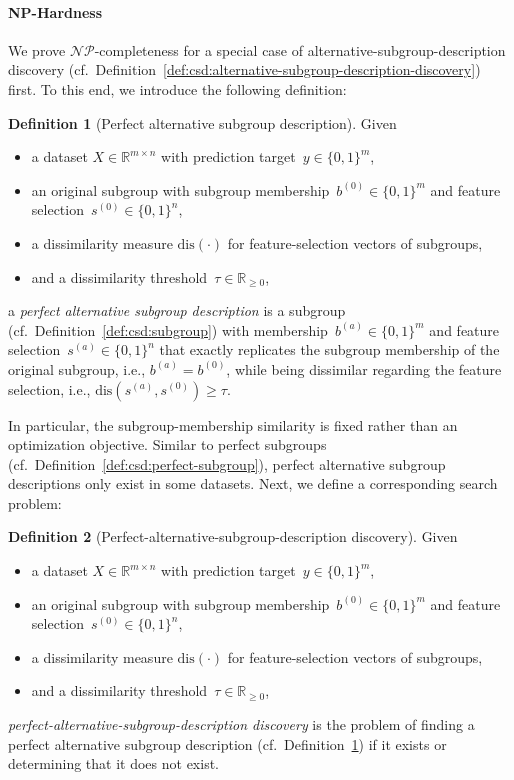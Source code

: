 \documentclass{article}
\theoremstyle{definition}
\newtheorem{definition}{Definition}
\begin{document}
\paragraph{NP-Hardness}

We prove $\mathcal{NP}$-completeness for a special case of alternative-subgroup-description discovery (cf.~Definition~\ref{def:csd:alternative-subgroup-description-discovery}) first.
To this end, we introduce the following definition:
%
\begin{definition}[Perfect alternative subgroup description]
	Given
	\begin{itemize}[noitemsep]
		\item a dataset $X \in \mathbb{R}^{m \times n}$ with prediction target~$y \in \{0, 1\}^m$,
		\item an original subgroup with subgroup membership~$b^{(0)} \in \{0, 1\}^m$ and feature selection~$s^{(0)} \in \{0, 1\}^n$,
		\item a dissimilarity measure $\text{dis}(\cdot)$ for feature-selection vectors of subgroups,
		\item and a dissimilarity threshold~$\tau \in \mathbb{R}_{\geq 0}$,
	\end{itemize}
	a \emph{perfect alternative subgroup description} is a subgroup (cf.~Definition~\ref{def:csd:subgroup}) with membership~$b^{(a)} \in \{0, 1\}^m$ and feature selection~$s^{(a)} \in \{0, 1\}^n$ that exactly replicates the subgroup membership of the original subgroup, i.e., $b^{(a)} = b^{(0)}$, while being dissimilar regarding the feature selection, i.e., $\text{dis}(s^{(a)}, s^{(0)}) \geq \tau$.
	\label{def:csd:perfect-alternative}
\end{definition}
%
In particular, the subgroup-membership similarity is fixed rather than an optimization objective.
Similar to perfect subgroups (cf.~Definition~\ref{def:csd:perfect-subgroup}), perfect alternative subgroup descriptions only exist in some datasets.
Next, we define a corresponding search problem:
%
\begin{definition}[Perfect-alternative-subgroup-description discovery]
	Given
	\begin{itemize}[noitemsep]
		\item a dataset $X \in \mathbb{R}^{m \times n}$ with prediction target~$y \in \{0, 1\}^m$,
		\item an original subgroup with subgroup membership~$b^{(0)} \in \{0, 1\}^m$ and feature selection~$s^{(0)} \in \{0, 1\}^n$,
		\item a dissimilarity measure $\text{dis}(\cdot)$ for feature-selection vectors of subgroups,
		\item and a dissimilarity threshold~$\tau \in \mathbb{R}_{\geq 0}$,
	\end{itemize}
	\emph{perfect-alternative-subgroup-description discovery} is the problem of finding a perfect alternative subgroup description (cf.~Definition~\ref{def:csd:perfect-alternative}) if it exists or determining that it does not exist.
	\label{def:csd:perfect-alternative-subgroup-description-discovery}
\end{definition}
\end{document}
